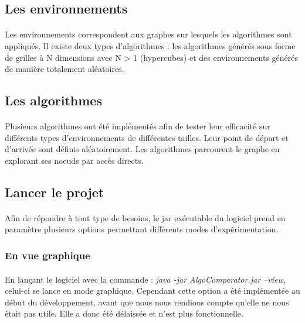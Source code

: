 \documentclass[pidr]{tnreport}
\begin{document}
			\subsection{Les environnements}

\paragraph{}
Les environnements correspondent aux graphes sur lesquels les algorithmes sont appliqués. Il existe deux types d'algorithmes : les algorithmes générés sous forme de grilles à N dimensions avec N > 1 (hypercubes) et des environnements générés de manière totalement aléatoires.
			
			\subsection{Les algorithmes}

\paragraph{}
Plusieurs algorithmes ont été implémentés afin de tester leur efficacité sur différents types d'environnements de différentes tailles. Leur point de départ et d'arrivée sont définis aléatoirement. Les algorithmes parcourent le graphe en explorant ses noeuds par accès directs.
		
		\subsection{Lancer le projet}

\paragraph{}
Afin de répondre à tout type de besoins, le jar exécutable du logiciel prend en paramètre plusieurs options permettant différents modes d'expérimentation.

			\subsubsection{En vue graphique}

\paragraph{}
En lançant le logiciel avec la commande : \emph{java -jar AlgoComparator.jar --view}, celui-ci se lance en mode graphique. Cependant cette option a été implémentée au début du développement, avant que nous nous rendions compte qu'elle ne nous était pas utile. Elle a donc été délaissée et n'est plus fonctionnelle.
\end{document}
